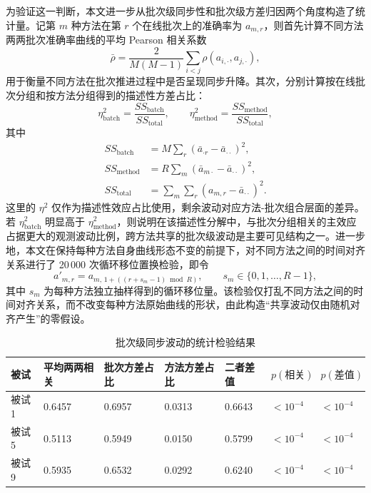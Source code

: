 为验证这一判断，本文进一步从批次级同步性和批次级方差归因两个角度构造了统计量。记第 $m$ 种方法在第 $r$ 个在线批次上的准确率为 $a_{m,r}$，则首先计算不同方法两两批次准确率曲线的平均 Pearson 相关系数
\begin{equation}
\bar{\rho}=\frac{2}{M(M-1)}\sum_{i<j}\rho\!\left(a_{i,\cdot},a_{j,\cdot}\right),
\end{equation}
用于衡量不同方法在批次推进过程中是否呈现同步升降。其次，分别计算按在线批次分组和按方法分组得到的描述性方差占比：
\begin{equation}
\eta^2_{\text{batch}}=\frac{SS_{\text{batch}}}{SS_{\text{total}}},\qquad
\eta^2_{\text{method}}=\frac{SS_{\text{method}}}{SS_{\text{total}}},
\end{equation}
其中
\begin{equation}
\begin{aligned}
SS_{\text{batch}}&=M\sum_{r}\left(\bar{a}_{\cdot r}-\bar{a}_{\cdot\cdot}\right)^2,\\
SS_{\text{method}}&=R\sum_{m}\left(\bar{a}_{m\cdot}-\bar{a}_{\cdot\cdot}\right)^2,\\
SS_{\text{total}}&=\sum_m\sum_r\left(a_{m,r}-\bar{a}_{\cdot\cdot}\right)^2.
\end{aligned}
\end{equation}
这里的 $\eta^2$ 仅作为描述性效应占比使用，剩余波动对应方法-批次组合层面的差异。若 $\eta^2_{\text{batch}}$ 明显高于 $\eta^2_{\text{method}}$，则说明在该描述性分解中，与批次分组相关的主效应占据更大的观测波动比例，跨方法共享的批次级波动是主要可见结构之一。进一步地，本文在保持每种方法自身曲线形态不变的前提下，对不同方法之间的时间对齐关系进行了 20\,000 次循环移位置换检验，即令
\begin{equation}
a'_{m,r}=a_{m,\,1+((r+s_m-1)\bmod R)},\qquad s_m\in\{0,1,\ldots,R-1\},
\end{equation}
其中 $s_m$ 为每种方法独立抽样得到的循环移位量。该检验仅打乱不同方法之间的时间对齐关系，而不改变每种方法原始曲线的形状，由此构造“共享波动仅由随机对齐产生”的零假设。

\begin{table}[htbp]
    \centering
    \small
    \caption{批次级同步波动的统计检验结果}
    \label{tab:c5_batch_level_sync_stats}
    \begin{tabular}{p{1.2cm}p{1.6cm}p{1.5cm}p{1.5cm}p{1.4cm}p{1.3cm}p{1.3cm}}
        \hline
        被试 & 平均两两相关 & 批次方差占比 & 方法方差占比 & 二者差值 & $p(\text{相关})$ & $p(\text{差值})$ \\
        \hline
        被试 1 & 0.6457 & 0.6957 & 0.0313 & 0.6643 & $<10^{-4}$ & $<10^{-4}$ \\
        被试 5 & 0.5113 & 0.5949 & 0.0150 & 0.5799 & $<10^{-4}$ & $<10^{-4}$ \\
        被试 9 & 0.5935 & 0.6532 & 0.0292 & 0.6240 & $<10^{-4}$ & $<10^{-4}$ \\
        \hline
    \end{tabular}
\end{table}

